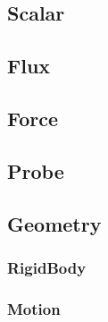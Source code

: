 \documentclass[11pt]{article}
\begin{document}
\subsection{Scalar}
\subsection{Flux}
\subsection{Force}
\subsection{Probe}
\subsection{Geometry}
\subsubsection{RigidBody}
\subsubsection{Motion}




% 
% 
\end{document}
